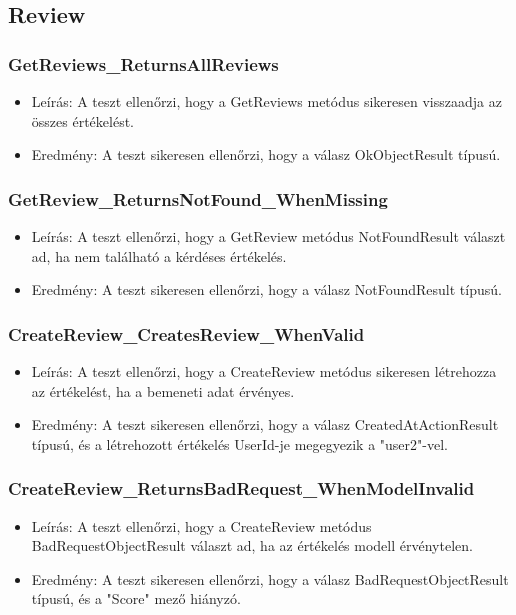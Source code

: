 \documentclass[11pt]{article}
\begin{document}
\subsection{Review}
\label{sec:orgd2e9e29}
\subsubsection{GetReviews\_ReturnsAllReviews}
\label{sec:orgba21834}
\begin{itemize}
\item Leírás: A teszt ellenőrzi, hogy a GetReviews metódus sikeresen visszaadja az összes értékelést.
\item Eredmény: A teszt sikeresen ellenőrzi, hogy a válasz OkObjectResult típusú.
\end{itemize}
\subsubsection{GetReview\_ReturnsNotFound\_WhenMissing}
\label{sec:org37813e3}
\begin{itemize}
\item Leírás: A teszt ellenőrzi, hogy a GetReview metódus NotFoundResult választ ad, ha nem található a kérdéses értékelés.
\item Eredmény: A teszt sikeresen ellenőrzi, hogy a válasz NotFoundResult típusú.
\end{itemize}
\subsubsection{CreateReview\_CreatesReview\_WhenValid}
\label{sec:org9ddb2a8}
\begin{itemize}
\item Leírás: A teszt ellenőrzi, hogy a CreateReview metódus sikeresen létrehozza az értékelést, ha a bemeneti adat érvényes.
\item Eredmény: A teszt sikeresen ellenőrzi, hogy a válasz CreatedAtActionResult típusú, és a létrehozott értékelés UserId-je megegyezik a "user2"-vel.
\end{itemize}
\subsubsection{CreateReview\_ReturnsBadRequest\_WhenModelInvalid}
\label{sec:org21620e2}
\begin{itemize}
\item Leírás: A teszt ellenőrzi, hogy a CreateReview metódus BadRequestObjectResult választ ad, ha az értékelés modell érvénytelen.
\item Eredmény: A teszt sikeresen ellenőrzi, hogy a válasz BadRequestObjectResult típusú, és a "Score" mező hiányzó.
\end{itemize}
\end{document}

